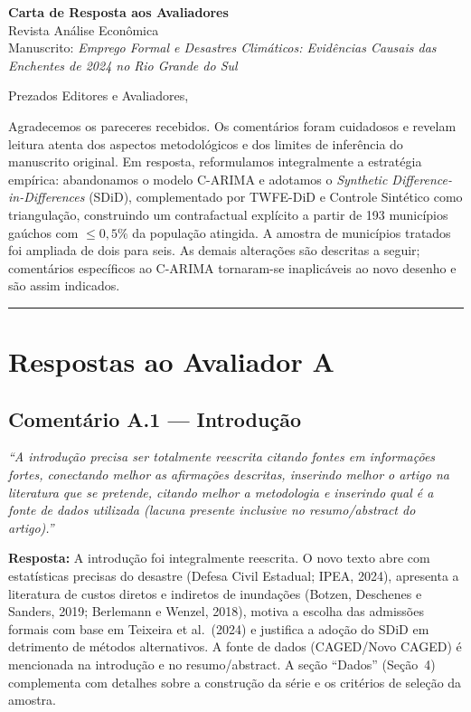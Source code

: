 \documentclass[a4paper,12pt]{article}
\newcommand{\avA}[1]{\textcolor{corA}{\textit{#1}}}
\newcommand{\resposta}[1]{\noindent\textbf{Resposta:} #1}
\begin{document}
\begin{center}
  {\large\bfseries Carta de Resposta aos Avaliadores}\\[0.4em]
  {\normalsize Revista Análise Econômica}\\[0.2em]
  {\small Manuscrito: \textit{Emprego Formal e Desastres Climáticos:
  Evidências Causais das Enchentes de 2024 no Rio Grande do Sul}}
\end{center}

\bigskip

\noindent Prezados Editores e Avaliadores,

\medskip

Agradecemos os pareceres recebidos. Os comentários foram cuidadosos e revelam leitura
atenta dos aspectos metodológicos e dos limites de inferência do manuscrito original.
Em resposta, reformulamos integralmente a estratégia empírica: abandonamos o modelo
C-ARIMA e adotamos o \textit{Synthetic Difference-in-Differences} (SDiD), complementado
por TWFE-DiD e Controle Sintético como triangulação, construindo um contrafactual
explícito a partir de 193 municípios gaúchos com $\leq 0{,}5\%$ da população atingida.
A amostra de municípios tratados foi ampliada de dois para seis. As demais alterações
são descritas a seguir; comentários específicos ao C-ARIMA tornaram-se inaplicáveis ao
novo desenho e são assim indicados.

\bigskip
\hrule
\bigskip

\section*{Respostas ao Avaliador A}

\subsection*{Comentário A.1 — Introdução}

\avA{``A introdução precisa ser totalmente reescrita citando fontes em informações
fortes, conectando melhor as afirmações descritas, inserindo melhor o artigo na
literatura que se pretende, citando melhor a metodologia e inserindo qual é a fonte
de dados utilizada (lacuna presente inclusive no resumo/abstract do artigo).''}

\bigskip

\resposta{A introdução foi integralmente reescrita. O novo texto abre com estatísticas
precisas do desastre (Defesa Civil Estadual; IPEA, 2024), apresenta a literatura de
custos diretos e indiretos de inundações (Botzen, Deschenes e Sanders, 2019; Berlemann
e Wenzel, 2018), motiva a escolha das admissões formais com base em Teixeira et al.\
(2024) e justifica a adoção do SDiD em detrimento de métodos alternativos. A fonte de
dados (CAGED/Novo CAGED) é mencionada na introdução e no resumo/abstract. A seção
``Dados'' (Seção~4) complementa com detalhes sobre a construção da série e os critérios
de seleção da amostra.}
\end{document}
